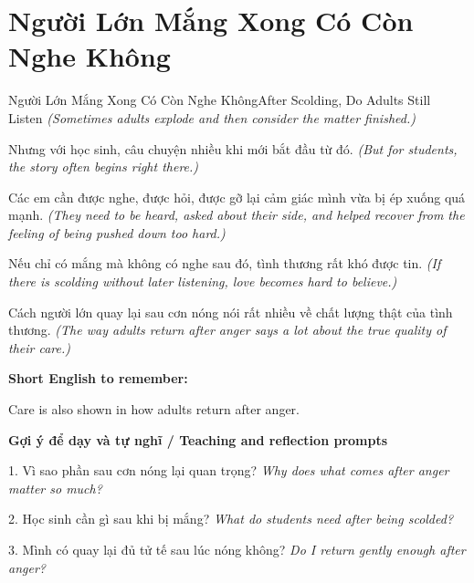 \section{Người Lớn Mắng Xong Có Còn Nghe Không}
\begin{truyen}{Người Lớn Mắng Xong Có Còn Nghe Không}{After Scolding, Do Adults Still Listen}
\textit{(Sometimes adults explode and then consider the matter finished.)}

Nhưng với học sinh, câu chuyện nhiều khi mới bắt đầu từ đó.
\textit{(But for students, the story often begins right there.)}

Các em cần được nghe, được hỏi, được gỡ lại cảm giác mình vừa bị ép xuống quá mạnh.
\textit{(They need to be heard, asked about their side, and helped recover from the feeling of being pushed down too hard.)}

Nếu chỉ có mắng mà không có nghe sau đó, tình thương rất khó được tin.
\textit{(If there is scolding without later listening, love becomes hard to believe.)}

\end{truyen}

\begin{baihoc}
Cách người lớn quay lại sau cơn nóng nói rất nhiều về chất lượng thật của tình thương.
\textit{(The way adults return after anger says a lot about the true quality of their care.)}
\end{baihoc}

\begin{ghinhoanh}
\textbf{Short English to remember:}

Care is also shown in how adults return after anger.

\end{ghinhoanh}

\begin{tuhocnhanh}
\textbf{Gợi ý để dạy và tự nghĩ / Teaching and reflection prompts}

1. Vì sao phần sau cơn nóng lại quan trọng? \textit{Why does what comes after anger matter so much?}

2. Học sinh cần gì sau khi bị mắng? \textit{What do students need after being scolded?}

3. Mình có quay lại đủ tử tế sau lúc nóng không? \textit{Do I return gently enough after anger?}
\end{tuhocnhanh}
\ngancach

